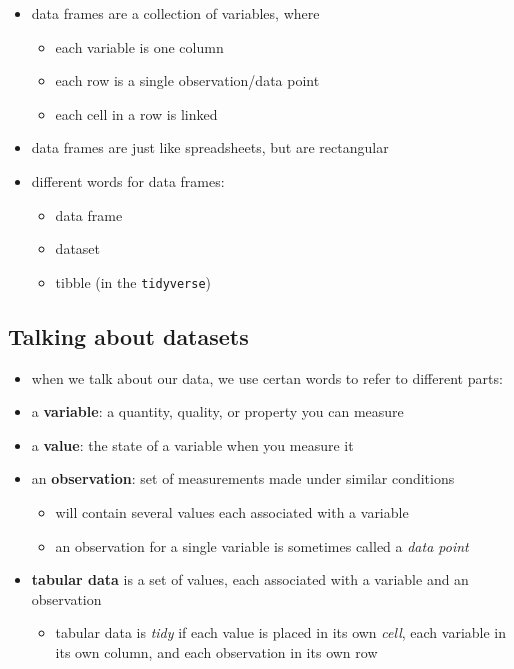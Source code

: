 \documentclass[
  letterpaper,
  DIV=11]{scrartcl}
\providecommand{\tightlist}{%
  \setlength{\itemsep}{0pt}\setlength{\parskip}{0pt}}\usepackage{longtable,booktabs,array}
\theoremstyle{definition}
\theoremstyle{remark}
\begin{document}
\begin{itemize}
\item
  data frames are a collection of variables, where

  \begin{itemize}
  \tightlist
  \item
    each variable is one column
  \item
    each row is a single observation/data point
  \item
    each cell in a row is linked
  \end{itemize}
\item
  data frames are just like spreadsheets, but are rectangular
\item
  different words for data frames:

  \begin{itemize}
  \tightlist
  \item
    data frame
  \item
    dataset
  \item
    tibble (in the \texttt{tidyverse})
  \end{itemize}
\end{itemize}

\hypertarget{talking-about-datasets}{%
\subsection{Talking about datasets}\label{talking-about-datasets}}

\begin{itemize}
\item
  when we talk about our data, we use certan words to refer to different
  parts:
\item
  a \textbf{variable}: a quantity, quality, or property you can measure
\item
  a \textbf{value}: the state of a variable when you measure it
\item
  an \textbf{observation}: set of measurements made under similar
  conditions

  \begin{itemize}
  \tightlist
  \item
    will contain several values each associated with a variable
  \item
    an observation for a single variable is sometimes called a
    \emph{data point}
  \end{itemize}
\item
  \textbf{tabular data} is a set of values, each associated with a
  variable and an observation

  \begin{itemize}
  \tightlist
  \item
    tabular data is \emph{tidy} if each value is placed in its own
    \emph{cell}, each variable in its own column, and each observation
    in its own row
  \end{itemize}
\end{itemize}
\end{document}
